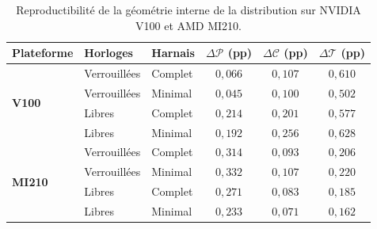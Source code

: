 \begin{table}[htb]
    \centering
    \small
    \caption{Reproductibilité de la géométrie interne de la distribution sur NVIDIA V100 et AMD MI210.}
    \label{tab:rq2_geometry_reproducibilite}
    \renewcommand{\arraystretch}{1.25}
    \begin{tabular}{lllccc}
        \toprule
        \textbf{Plateforme} & \textbf{Horloges} & \textbf{Harnais} & 
        \textbf{$\Delta\mathcal{P}$ (pp)} & 
        \textbf{$\Delta\mathcal{C}$ (pp)} & 
        \textbf{$\Delta\mathcal{T}$ (pp)} \\
        \midrule
        \multirow{4}{*}{\textbf{V100}} 
        & Verrouillées & Complet  & $0{,}066$ & $0{,}107$ & $0{,}610$ \\
        & Verrouillées & Minimal  & $0{,}045$ & $0{,}100$ & $0{,}502$ \\
        & Libres       & Complet  & $0{,}214$ & $0{,}201$ & $0{,}577$ \\
        & Libres       & Minimal  & $0{,}192$ & $0{,}256$ & $0{,}628$ \\
        \midrule
        \multirow{4}{*}{\textbf{MI210}} 
        & Verrouillées & Complet  & $0{,}314$ & $0{,}093$ & $0{,}206$ \\
        & Verrouillées & Minimal  & $0{,}332$ & $0{,}107$ & $0{,}220$ \\
        & Libres       & Complet  & $0{,}271$ & $0{,}083$ & $0{,}185$ \\
        & Libres       & Minimal  & $0{,}233$ & $0{,}071$ & $0{,}162$ \\
        \bottomrule
    \end{tabular}
    \vspace{0.15cm}
\end{table}
